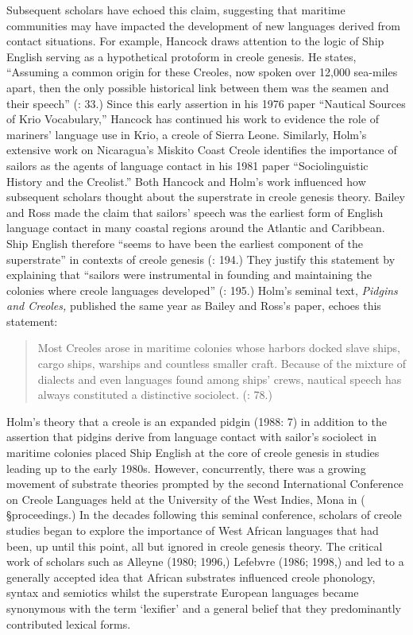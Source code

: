 Subsequent scholars have echoed this claim, suggesting that maritime communities may have impacted the development of new languages derived from contact situations. For example, Hancock draws attention to the logic of Ship English serving as a hypothetical protoform in creole genesis. He states, “Assuming a common origin for these Creoles, now spoken over 12,000 sea-miles apart, then the only possible historical link between them was the seamen and their speech” (\citealt{Hancock1976}: 33.) Since this early assertion in his 1976 paper “Nautical Sources of Krio Vocabulary,” Hancock has continued his work to evidence the role of mariners’ language use in Krio, a creole of Sierra Leone. Similarly, Holm’s extensive work on Nicaragua’s Miskito Coast Creole identifies the importance of sailors as the agents of language contact in his 1981 paper “Sociolinguistic History and the Creolist.” Both Hancock and Holm’s work influenced how subsequent scholars thought about the superstrate in creole genesis theory. \citealt{In1988} Bailey and Ross made the claim that sailors’ speech was the earliest form of English language contact in many coastal regions around the Atlantic and Caribbean. Ship English therefore “seems to have been the earliest component of the superstrate” in contexts of creole genesis (\citealt{BaileyRoss1988}: 194.) They justify this statement by explaining that “sailors were instrumental in founding and maintaining the colonies where creole languages developed” (\citealt{BaileyRoss1988}: 195.) Holm’s seminal text, \textit{Pidgins and Creoles,} published the same year as Bailey and Ross’s paper, echoes this statement: 

\begin{quotation}
Most Creoles arose in maritime colonies whose harbors docked slave ships, cargo ships, warships and countless smaller craft. Because of the mixture of dialects and even languages found among ships' crews, nautical speech has always constituted a distinctive sociolect. (\citealt{Holm1988}: 78.) \end{quotation}

Holm’s theory that a creole is an expanded pidgin (1988: 7) in addition to the assertion that pidgins derive from language contact with sailor’s sociolect in maritime colonies placed Ship English at the core of creole genesis in studies leading up to the early 1980s. However, concurrently, there was a growing movement of substrate theories prompted by the second International Conference on Creole Languages held at the University of the West Indies, Mona in \citealt{April1968} (\citealt{Hymes1971} §proceedings.) In the decades following this seminal conference, scholars of creole studies began to explore the importance of West African languages that had been, up until this point, all but ignored in creole genesis theory. The critical work of scholars such as Alleyne (1980; 1996,) Lefebvre (1986; 1998,) and \citet{Parkvall2000} led to a generally accepted idea that African substrates influenced creole phonology, syntax and semiotics whilst the superstrate European languages became synonymous with the term ‘lexifier’ and a general belief that they predominantly contributed lexical forms.

